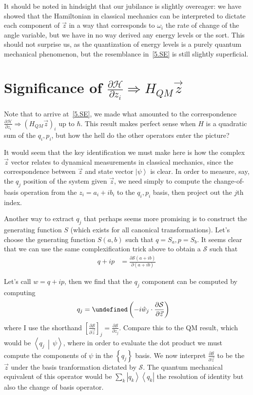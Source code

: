 \documentclass[12pt]{report}
\newcommand{\bra}[1]{\left<#1\right|}
\newcommand{\ket}[1]{\left|#1\right>}
\newcommand{\dotp}[2]{\left<#1\,\middle|\,#2\right>}
\newcommand{\pd}[2]{\frac{\partial#1}{\partial#2}}
\let\Re\undefined
\DeclareMathOperator{\Re}{Re}
\begin{document}
It should be noted in hindsight that our jubilance is slightly overeager: we
have showed that the Hamiltonian in classical mechanics can be interpreted to
dictate each component of $\vec{z}$ in a way that corresponds to $\omega_i$ the
rate of change of the angle variable, but we have in no way derived any energy
levels or the sort. This should not surprise us, as the quantization of energy
levels is a purely quantum mechanical phenomenon, but the resemblance
in~\autoref{5.SE} is still slightly superficial.

\section{Significance of $\pd{\mathcal{H}}{z_i} \Rightarrow H_{QM}\vec{z}$}

Note that to arrive at~\eqref{5.SE}, we made what amounted to the correspondence
$\pd{\mathcal{H}}{z_i} \Rightarrow \left( H_{QM}\vec{z} \right)_i$ up to
$\hbar$. This result makes perfect sense when $H$ is a quadratic sum of the
$q_i, p_i$, but how the hell do the other operators enter the picture?

It would seem that the key identification we must make here is how the complex
$\vec{z}$ vector relates to dynamical measurements in classical mechanics, since
the correspondence between $\vec{z}$ and state vector $\ket{\psi}$ is clear. In
order to measure, say, the $q_j$ position of the system given $\vec{z}$, we need
simply to compute the change-of-basis operation from the $z_i = a_i + ib_i$ to
the $q_i, p_i$ basis, then project out the $j$th index.

Another way to extract $q_j$ that perhaps seems more promising is to construct
the generating function $S$ (which exists for all canonical transformations).
Let's choose the generating function $S(a,b)$ such that $q = S_a, p=S_b$. It
seems clear that we can use the same complexification trick above to obtain a
$\mathcal{S}$ such that
\begin{align}
    q + ip &= \pd{\mathcal{S}(a + ib)}{(a+ib)}
\end{align}

Let's call $w=q+ip$, then we find that the $q_j$ component can be computed by computing
\begin{align}
    q_j &= \Re\left(-i\hat{w}_j \cdot \pd{\mathcal{S}}{\vec{z}}\right)
\end{align}
where I use the shorthand
$\left[ \pd{\mathcal{S}}{\vec{z}} \right]_j = \pd{\mathcal{S}}{z_j}$. Compare
this to the QM result, which would be $\dotp{q_j}{\psi}$, where in order to
evaluate the dot product we must compute the components of $\psi$ in the
$\left\{ q_j \right\}$ basis. We now interpret $\pd{\mathcal{S}}{\vec{z}}$ to be
the $\vec{z}$ under the basis tranformation dictated by $\mathcal{S}$. The
quantum mechanical equivalent of this operator would be $\sum_k
\ket{q_k}\bra{q_k}$ the resolution of identity but also the change of basis
operator.
\end{document}
